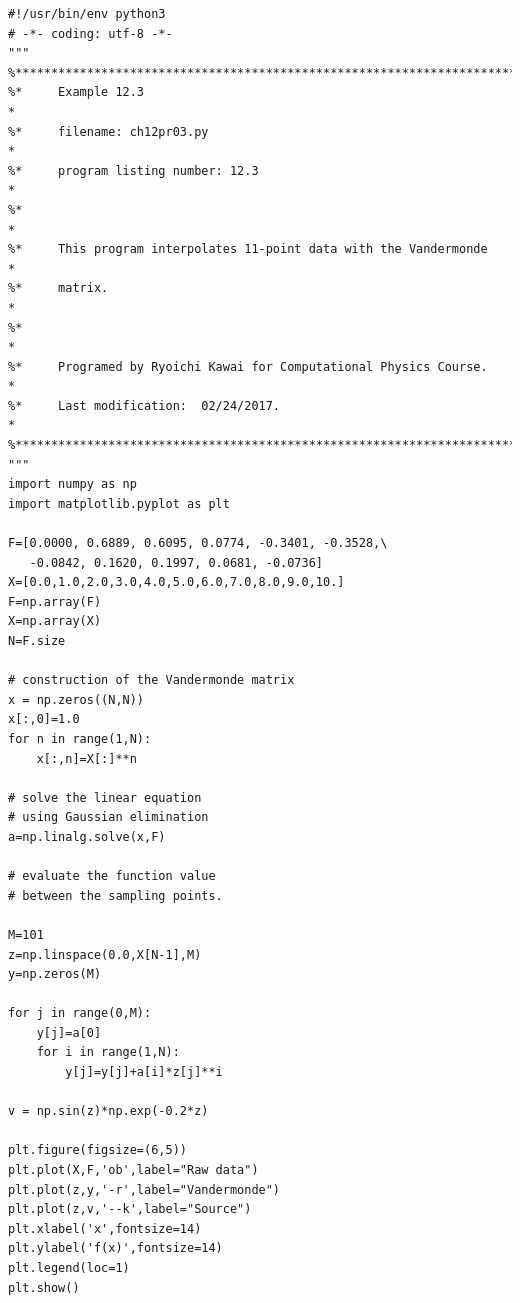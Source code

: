
\bigskip
\noindent
\program
\footnotesize
\begin{verbatim}
#!/usr/bin/env python3
# -*- coding: utf-8 -*-
"""
%**************************************************************************
%*     Example 12.3                                                       *
%*     filename: ch12pr03.py                                              *
%*     program listing number: 12.3                                       *
%*                                                                        *
%*     This program interpolates 11-point data with the Vandermonde       *
%*     matrix.                                                            *
%*                                                                        *
%*     Programed by Ryoichi Kawai for Computational Physics Course.       *
%*     Last modification:  02/24/2017.                                    *
%**************************************************************************
"""
import numpy as np
import matplotlib.pyplot as plt

F=[0.0000, 0.6889, 0.6095, 0.0774, -0.3401, -0.3528,\
   -0.0842, 0.1620, 0.1997, 0.0681, -0.0736]
X=[0.0,1.0,2.0,3.0,4.0,5.0,6.0,7.0,8.0,9.0,10.]
F=np.array(F)
X=np.array(X)
N=F.size

# construction of the Vandermonde matrix
x = np.zeros((N,N))
x[:,0]=1.0
for n in range(1,N):
    x[:,n]=X[:]**n

# solve the linear equation
# using Gaussian elimination
a=np.linalg.solve(x,F)

# evaluate the function value
# between the sampling points.

M=101
z=np.linspace(0.0,X[N-1],M)
y=np.zeros(M)

for j in range(0,M):
    y[j]=a[0]
    for i in range(1,N):
        y[j]=y[j]+a[i]*z[j]**i

v = np.sin(z)*np.exp(-0.2*z)

plt.figure(figsize=(6,5))
plt.plot(X,F,'ob',label="Raw data")
plt.plot(z,y,'-r',label="Vandermonde")
plt.plot(z,v,'--k',label="Source")
plt.xlabel('x',fontsize=14)
plt.ylabel('f(x)',fontsize=14)
plt.legend(loc=1)
plt.show()
\end{verbatim}
\normalsize


